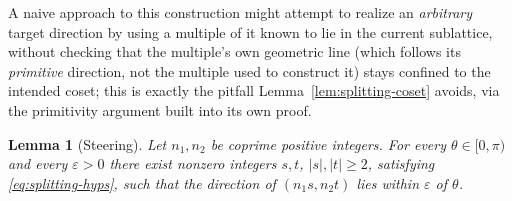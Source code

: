 \documentclass[a4paper,11pt,oneside,reqno]{amsart}
\theoremstyle{definition}
\theoremstyle{remark}
\theoremstyle{plain}
\newtheorem{lemma}[definition]{Lemma}
\begin{document}
A naive approach to this construction might attempt to realize an \emph{arbitrary} target
direction by using a multiple of it known to lie in the current sublattice, without checking that
the multiple's own geometric line (which follows its \emph{primitive} direction, not the multiple
used to construct it) stays confined to the intended coset; this is exactly the pitfall
Lemma~\ref{lem:splitting-coset} avoids, via the primitivity argument built into its own proof.

\begin{lemma}[Steering]
  \label{lem:steering}
  Let \(n_1,n_2\) be coprime positive integers. For every \(\theta\in[0,\pi)\) and every
  \(\varepsilon>0\) there exist nonzero integers \(s,t\), \(|s|,|t|\ge2\), satisfying
  \eqref{eq:splitting-hyps}, such that the direction of \((n_1s,n_2t)\) lies within \(\varepsilon\) of
  \(\theta\).
\end{lemma}
\end{document}
